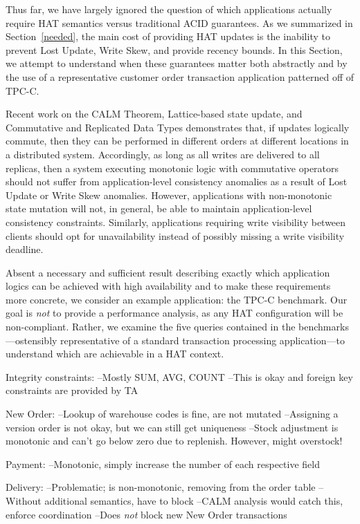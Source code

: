 Thus far, we have largely ignored the question of which applications
actually require HAT semantics versus traditional ACID guarantees. As
we summarized in Section~\ref{needed}, the main cost of providing HAT
updates is the inability to prevent Lost Update, Write Skew, and
provide recency bounds. In this Section, we attempt to understand when
these guarantees matter both abstractly and by the use of a
representative customer order transaction application patterned off of
TPC-C.

Recent work on the CALM Theorem, Lattice-based state update, and
Commutative and Replicated Data Types demonstrates that, if updates
logically commute, then they can be performed in different orders at
different locations in a distributed system. Accordingly, as long as
all writes are delivered to all replicas, then a system executing
monotonic logic with commutative operators should not suffer from
application-level consistency anomalies as a result of Lost Update or
Write Skew anomalies. However, applications with non-monotonic state
mutation will not, in general, be able to maintain application-level
consistency constraints. Similarly, applications requiring
write visibility between clients should opt for unavailability instead
of possibly missing a write visibility deadline.

Absent a necessary and sufficient result describing exactly which
application logics can be achieved with high availability and to make
these requirements more concrete, we consider an example application:
the TPC-C benchmark. Our goal is \textit{not} to provide a performance
analysis, as any HAT configuration will be non-compliant. Rather, we
examine the five queries contained in the benchmarks---ostensibly
representative of a standard transaction processing application---to
understand which are achievable in a HAT context.

Integrity constraints:
--Mostly SUM, AVG, COUNT
--This is okay and foreign key constraints are provided by TA

New Order:
--Lookup of warehouse codes is fine, are not mutated
--Assigning a version order is not okay, but we can still get uniqueness
--Stock adjustment is monotonic and can't go below zero due to replenish. However, might overstock!

Payment:
--Monotonic, simply increase the number of each respective field

Delivery:
--Problematic; is non-monotonic, removing from the order table
--Without additional semantics, have to block
--CALM analysis would catch this, enforce coordination
--Does \textit{not} block new New Order transactions

